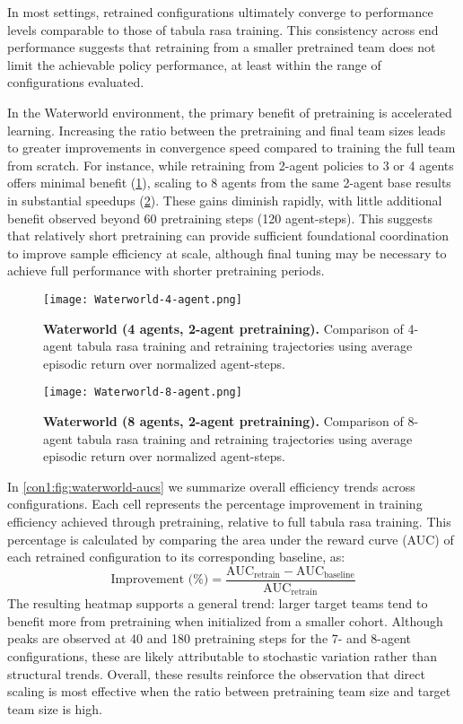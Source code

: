 \documentclass{article}
\begin{document}
In most settings, retrained configurations ultimately converge to 
performance levels comparable to those of tabula rasa training.
This consistency across end performance suggests that retraining from a smaller 
pretrained team does not limit the achievable policy performance, 
at least within the range of configurations evaluated.

In the Waterworld environment, the primary benefit of pretraining is accelerated learning. 
Increasing the ratio between the pretraining and final team sizes leads to greater improvements 
in convergence speed compared to training the full team from scratch. For instance, 
while retraining from 2-agent policies to 3 or 4 agents offers minimal benefit 
(\cref{con1:fig:waterworld-4}), scaling to 8 agents from the same 2-agent base results in 
substantial speedups (\cref{con1:fig:waterworld-8}). These gains diminish rapidly, 
with little additional benefit observed beyond 60 pretraining steps (120 agent-steps).
This suggests that relatively short pretraining can provide sufficient foundational 
coordination to improve sample efficiency at scale, although final tuning may 
be necessary to achieve full performance with shorter pretraining periods.

\begin{figure}[!ht]
    \centering
    \texttt{[image: Waterworld-4-agent.png]}
    \caption{\textbf{Waterworld (4 agents, 2-agent pretraining).} Comparison of 
    4-agent tabula rasa training and retraining trajectories using average 
    episodic return over normalized agent-steps.}
    \label{con1:fig:waterworld-4}
\end{figure}

\begin{figure}[!ht]
    \centering
    \texttt{[image: Waterworld-8-agent.png]}
    \caption{\textbf{Waterworld (8 agents, 2-agent pretraining).} Comparison of 
    8-agent tabula rasa training and retraining trajectories using average 
    episodic return over normalized agent-steps.}
    \label{con1:fig:waterworld-8}
\end{figure}

In \cref{con1:fig:waterworld-aucs} we summarize overall efficiency trends across configurations. 
Each cell represents the percentage improvement in training efficiency 
achieved through pretraining, relative to full tabula rasa training.
This percentage is calculated by comparing the area under the reward curve 
(AUC) of each retrained configuration to its corresponding baseline, as:
\[
    \text{Improvement (\%)} 
    = \frac{\text{AUC}_{\text{retrain}} - \text{AUC}_{\text{baseline}}}{\text{AUC}_{\text{retrain}}}
\]
The resulting heatmap supports a general trend: larger target teams tend to 
benefit more from pretraining when initialized from a smaller cohort.
Although peaks are observed at 40 and 180 pretraining steps for the 7- and 8-agent configurations, 
these are likely attributable to stochastic variation rather than structural trends.
Overall, these results reinforce the observation that direct scaling is most effective 
when the ratio between pretraining team size and target team size is high.
\end{document}
